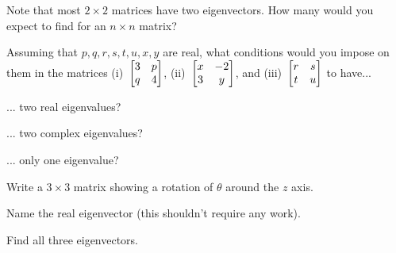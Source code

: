 \documentclass[../gatm_answers.tex]{subfiles}
\begin{document}
\begin{outer_problem}
\item Note that most $2\times 2$ matrices have two eigenvectors. How many would you expect to find for an $n\times n$ matrix?
\end{outer_problem}

\begin{outer_problem}
\item Assuming that $p,q,r,s,t,u,x,y$ are real, what conditions would you impose on them in the matrices (i)~$\begin{bmatrix} 3 & p \\ q & 4 \end{bmatrix}$, (ii)~$\begin{bmatrix} x & -2 \\ 3 & y \end{bmatrix}$, and (iii)~$\begin{bmatrix} r & s \\ t & u \end{bmatrix}$ to have...
\end{outer_problem}

\begin{inner_problem}[start=1]
\item ... two real eigenvalues?
\end{inner_problem}

\begin{inner_problem}
\item ... two complex eigenvalues?
\end{inner_problem}

\begin{inner_problem}
\item ... only one eigenvalue?
\end{inner_problem}

\begin{outer_problem}
\item
\end{outer_problem}

\begin{inner_problem}[start=1]
\item Write a $3\times 3$ matrix showing a rotation of $\theta$ around the $z$ axis.
\end{inner_problem}

\begin{inner_problem}
\item Name the real eigenvector (this shouldn't require any work).
\end{inner_problem}

\begin{inner_problem}
\item Find all three eigenvectors.
\end{inner_problem}

\begin{outer_problem}
\item
\end{outer_problem}
\end{document}
